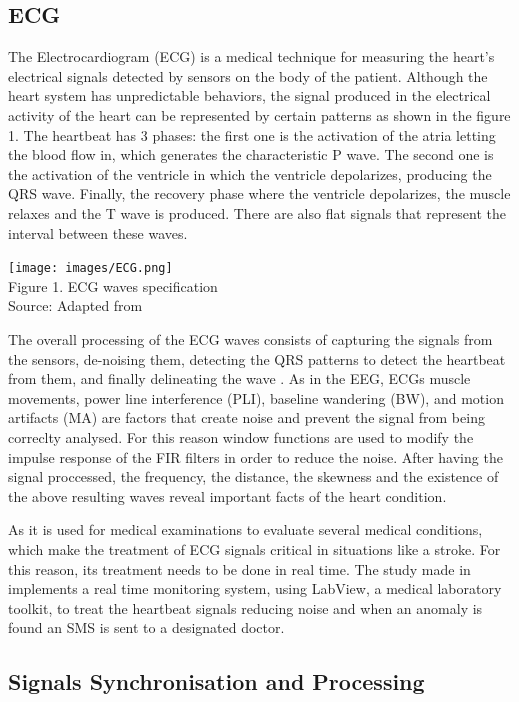 \subsection{ECG}
The Electrocardiogram (ECG) is a medical technique for measuring the heart's electrical signals detected by sensors on the body of the patient. Although the heart system has unpredictable behaviors, the signal produced in the electrical activity of the heart can be represented by certain patterns  as shown in the figure 1. The heartbeat has 3 phases: the first one is the activation of the atria letting the blood flow in, which generates the characteristic P wave. The second one is the activation of the ventricle in which the ventricle depolarizes, producing the QRS wave. Finally, the recovery phase where the ventricle depolarizes, the muscle relaxes  and the T wave is produced. There are also flat signals that represent the interval between these waves. 

\begin{center}
\texttt{[image: images/ECG.png]}
\\Figure 1. ECG waves specification
\\Source: Adapted from \cite{ECGEventB}
\end{center}


The overall processing of the ECG waves consists of capturing the signals from the sensors, de-noising them, detecting the QRS patterns to detect the heartbeat from them, and finally delineating the wave \cite{ECGsignalprocc}.
As in the EEG, ECGs muscle movements, power line interference (PLI), baseline wandering (BW), and motion artifacts (MA) are factors that create noise and prevent the signal from being correclty analysed. For this reason window functions are used to modify the impulse response of the FIR filters in order to reduce the noise.  After having the signal proccessed, the frequency, the distance, the skewness and the existence of the above resulting waves reveal important facts of the heart condition.


As it is used for medical examinations to evaluate several medical conditions, which make the treatment of ECG signals critical in situations like a stroke. For this reason, its treatment needs to be done in real time. The study made in \cite{ECGsyc} implements a real time monitoring system, using LabView, a medical laboratory toolkit, to treat the heartbeat signals reducing noise and when an anomaly is found an SMS is sent to a designated doctor.


\subsection{Signals Synchronisation and Processing}



